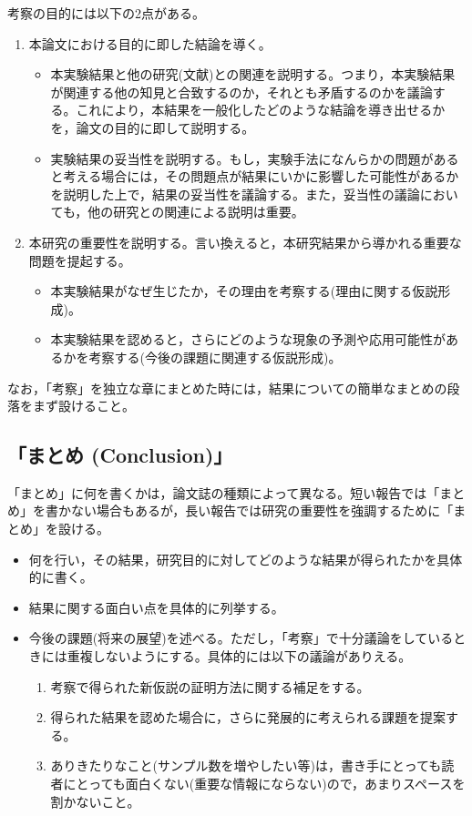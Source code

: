 \documentclass[12pt, ]{jsarticle}
\providecommand{\tightlist}{%
   \setlength{\itemsep}{0pt}\setlength{\parskip}{0pt}}
\begin{document}
考察の目的には以下の2点がある。

\begin{enumerate}
\tightlist
\item
  本論文における目的に即した結論を導く。

  \begin{itemize}
  \tightlist
  \item
    本実験結果と他の研究(文献)との関連を説明する。つまり，本実験結果が関連する他の知見と合致するのか，それとも矛盾するのかを議論する。これにより，本結果を一般化したどのような結論を導き出せるかを，論文の目的に即して説明する。
  \item
    実験結果の妥当性を説明する。もし，実験手法になんらかの問題があると考える場合には，その問題点が結果にいかに影響した可能性があるかを説明した上で，結果の妥当性を議論する。また，妥当性の議論においても，他の研究との関連による説明は重要。
  \end{itemize}
\item
  本研究の重要性を説明する。言い換えると，本研究結果から導かれる重要な問題を提起する。

  \begin{itemize}
  \tightlist
  \item
    本実験結果がなぜ生じたか，その理由を考察する(理由に関する仮説形成)。
  \item
    本実験結果を認めると，さらにどのような現象の予測や応用可能性があるかを考察する(今後の課題に関連する仮説形成)。
  \end{itemize}
\end{enumerate}

なお，「考察」を独立な章にまとめた時には，結果についての簡単なまとめの段落をまず設けること。

\subsection{「まとめ
(Conclusion)」}\label{ux307eux3068ux3081-conclusion}

「まとめ」に何を書くかは，論文誌の種類によって異なる。短い報告では「まとめ」を書かない場合もあるが，長い報告では研究の重要性を強調するために「まとめ」を設ける。

\begin{itemize}
\tightlist
\item
  何を行い，その結果，研究目的に対してどのような結果が得られたかを具体的に書く。
\item
  結果に関する面白い点を具体的に列挙する。
\item
  今後の課題(将来の展望)を述べる。ただし，「考察」で十分議論をしているときには重複しないようにする。具体的には以下の議論がありえる。

  \begin{enumerate}
  \tightlist
  \item
    考察で得られた新仮説の証明方法に関する補足をする。
  \item
    得られた結果を認めた場合に，さらに発展的に考えられる課題を提案する。
  \item
    ありきたりなこと(サンプル数を増やしたい等)は，書き手にとっても読者にとっても面白くない(重要な情報にならない)ので，あまりスペースを割かないこと。
  \end{enumerate}
\end{itemize}
\end{document}
